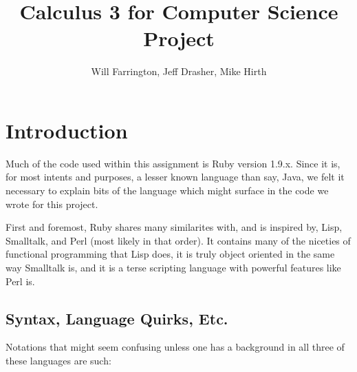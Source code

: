 \documentclass[letterpaper,12pt]{article}
\author{Will Farrington, Jeff Drasher, Mike Hirth}
\title{Calculus 3 for Computer Science Project}
\begin{document}
\maketitle
\tableofcontents
\newpage
\section{Introduction}

Much of the code used within this assignment is Ruby version 1.9.x.
Since it is, for most intents and purposes, a lesser known language than say,
Java, we felt it necessary to explain bits of the language which might surface
in the code we wrote for this project.

First and foremost, Ruby shares many similarites with, and is inspired by, Lisp,
Smalltalk, and Perl (most likely in that order).
It contains many of the niceties of functional programming that Lisp does, it is
truly object oriented in the same way Smalltalk is, and it is a terse scripting
language with powerful features like Perl is.

\subsection{Syntax, Language Quirks, Etc.}

Notations that might seem confusing unless one has a background in all three of
these languages are such:
\end{document}
